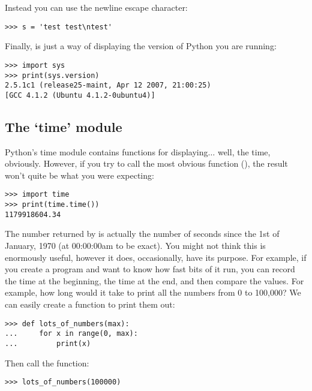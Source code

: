 Instead you can use the newline escape character:
\begin{Verbatim}[frame=single]
>>> s = 'test test\ntest'
\end{Verbatim}

\noindent
Finally,  is just a way of displaying the version of Python you are running:

\begin{Verbatim}[frame=single]
>>> import sys
>>> print(sys.version)
2.5.1c1 (release25-maint, Apr 12 2007, 21:00:25)
[GCC 4.1.2 (Ubuntu 4.1.2-0ubuntu4)]
\end{Verbatim}

\subsection*{The `time' module}

Python's time module contains functions for displaying$\ldots$ well, the time, obviously. However, if you try to call the most obvious function (), the result won't quite be what you were expecting:

\begin{Verbatim}[frame=single]
>>> import time
>>> print(time.time())
1179918604.34
\end{Verbatim}

The number returned by  is actually the number of seconds since the 1st of January, 1970 (at 00:00:00am to be exact). You might not think this is enormously useful, however it does, occasionally, have its purpose. For example, if you create a program and want to know how fast bits of it run, you can record the time at the beginning, the time at the end, and then compare the values. For example, how long would it take to print all the numbers from 0 to 100,000?  We can easily create a function to print them out:

\begin{Verbatim}[frame=single]
>>> def lots_of_numbers(max):
...     for x in range(0, max):
...         print(x)
\end{Verbatim}

\noindent
Then call the function:

\begin{Verbatim}[frame=single]
>>> lots_of_numbers(100000)
\end{Verbatim}

